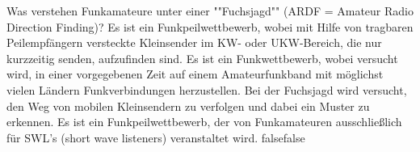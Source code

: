     {Was verstehen Funkamateure unter einer ""Fuchsjagd"" (ARDF = Amateur Radio Direction Finding)?}
    {Es ist ein Funkpeilwettbewerb, wobei mit Hilfe von tragbaren Peilempfängern versteckte Kleinsender im KW- oder UKW-Bereich, die nur kurzzeitig senden, aufzufinden sind.}
    {Es ist ein Funkwettbewerb, wobei versucht wird, in einer vorgegebenen Zeit auf einem Amateurfunkband mit möglichst vielen Ländern Funkverbindungen herzustellen.}
    {Bei der Fuchsjagd wird versucht, den Weg von mobilen Kleinsendern zu verfolgen und dabei ein Muster zu erkennen.}
    {Es ist ein Funkpeilwettbewerb, der von Funkamateuren ausschließlich für SWL's (short wave listeners) veranstaltet wird. }
    {false}{false}